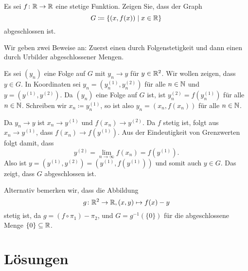 \documentclass[a4paper,10pt]{article}
\begin{document}
\begin{question}
 Es sei $f \colon \mathbb{R} \to \mathbb{R}$ eine stetige Funktion. Zeigen Sie, dass der Graph
 \[
  G \coloneqq \{(x,f(x)) \mid x \in \mathbb{R}\}
 \]
 abgeschlossen ist.
\end{question}
\begin{solution}
 Wir geben zwei Beweise an: Zuerst einen durch Folgenstetigkeit und dann einen durch Urbilder abgeschlossener Mengen.
 
 Es sei $(y_n)$ eine Folge auf $G$ mit $y_n \to y$ für $y \in \mathbb{R}^2$. Wir wollen zeigen, dass $y \in G$. In Koordinaten sei $y_n = (y^{(1)}_n, y^{(2)}_n)$ für alle $n \in \mathbb{N}$ und $y = (y^{(1)}, y^{(2)})$. Da $(y_n)$ eine Folge auf $G$ ist, ist $y^{(2)}_n = f(y^{(1)}_n)$ für alle $n \in \mathbb{N}$. Schreiben wir $x_n \coloneqq y^{(1)}_n$, so ist also $y_n = (x_n, f(x_n))$ für alle $n \in \mathbb{N}$.
 
 Da $y_n \to y$ ist $x_n \to y^{(1)}$ und $f(x_n) \to y^{(2)}$. Da $f$ stetig ist, folgt aus $x_n \to y^{(1)}$, dass $f(x_n) \to f(y^{(1)})$. Aus der Eindeutigkeit von Grenzwerten folgt damit, dass
 \[
  y^{(2)} = \lim_{n \to \infty} f(x_n) = f\left(y^{(1)}\right).
 \]
 Also ist $y = (y^{(1)}, y^{(2)}) = (y^{(1)}, f(y^{(1)}))$ und somit auch $y \in G$. Das zeigt, dass $G$ abgeschlossen ist.
 
 Alternativ bemerken wir, dass die Abbildung
 \[
  g \colon \mathbb{R}^2 \to \mathbb{R}, (x,y) \mapsto f(x)-y
 \]
 stetig ist, da $g = (f \circ \pi_1) - \pi_2$, und $G = g^{-1}(\{0\})$ für die abgeschlossene Menge $\{0\} \subseteq \mathbb{R}$.
\end{solution}





\newpage

\section{Lösungen}

\printsolutions
\end{document}
